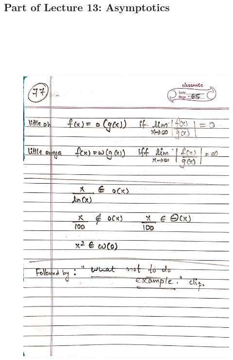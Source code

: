 \newpage
{\color{black} \subsection*{Part of Lecture 13: Asymptotics}}
\begin{figure}[H]
    \centering
    \includegraphics[width=16cm, height=21cm]{"./MIT-6.042J/MIT-6042J-077"}
\end{figure}

